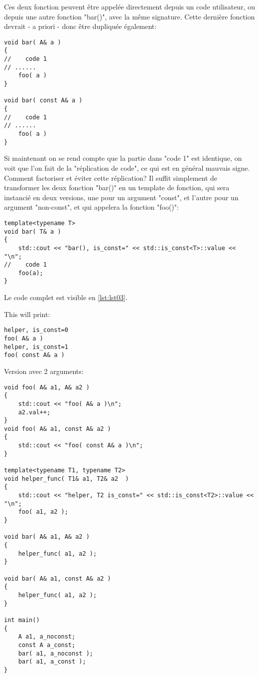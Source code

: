 \documentclass[11pt,a4paper]{article}
\begin{document}
Ces deux fonction peuvent être appelée directement depuis un code utilisateur, ou depuis une autre fonction "bar()", avec la même signature.
Cette dernière fonction devrait - a priori - donc être dupliquée également:
\begin{lstlisting}
void bar( A& a )
{
//    code 1
// ......
	foo( a )
}

void bar( const A& a )
{
//    code 1
// ......
	foo( a )
}
\end{lstlisting}

Si maintenant on se rend compte que la partie dans "code 1" est identique, on voit que l'on fait de la "réplication de code", ce qui est en général mauvais signe.
Comment factoriser et éviter cette réplication?
Il suffit simplement de transformer les deux fonction "bar()" en un template de fonction, qui sera instancié en deux versions, une pour un argument "const", et l'autre pour un argument "non-const", et qui appelera la fonction "foo()":


\begin{lstlisting}
template<typename T>
void bar( T& a )
{
    std::cout << "bar(), is_const=" << std::is_const<T>::value << "\n";
//    code 1    
	foo(a);
}
\end{lstlisting}

Le code complet est visible en \ref{lst:lst03}.




This will print:
\begin{lstlisting}
helper, is_const=0
foo( A& a )
helper, is_const=1
foo( const A& a )
\end{lstlisting}

Version avec 2 arguments:

\begin{lstlisting}
void foo( A& a1, A& a2 )
{
    std::cout << "foo( A& a )\n";
    a2.val++;
}
void foo( A& a1, const A& a2 )
{
    std::cout << "foo( const A& a )\n";
}

template<typename T1, typename T2>
void helper_func( T1& a1, T2& a2  )
{
    std::cout << "helper, T2 is_const=" << std::is_const<T2>::value << "\n";
	foo( a1, a2 );
}

void bar( A& a1, A& a2 )
{
	helper_func( a1, a2 );
}

void bar( A& a1, const A& a2 )
{
	helper_func( a1, a2 );
}
 
int main()
{
    A a1, a_noconst;
    const A a_const;
    bar( a1, a_noconst );
    bar( a1, a_const );
}
\end{lstlisting}
\end{document}
